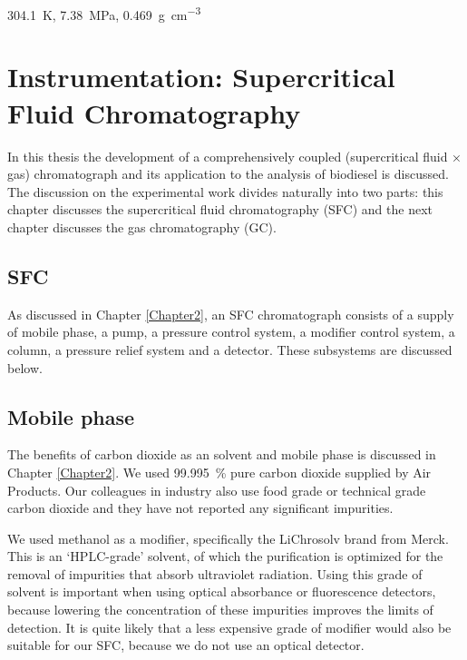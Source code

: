 
\begin{savequote}[\quotewidth]
\SI{304.1}{\kelvin}, \SI{7.38}{\mega\pascal}, \SI{0.469}{\gram\per\cubic\centi\metre}
\end{savequote}

\chapter{Instrumentation: Supercritical Fluid Chromatography} %

\label{Chapter4} %

In this thesis the development of a comprehensively coupled (supercritical fluid
× gas) chromatograph and its application to the analysis of biodiesel is
discussed. The discussion on the experimental work divides naturally into two
parts: this chapter discusses the supercritical fluid chromatography (SFC) and
the next chapter discusses the gas chromatography (GC).

\section{SFC}

As discussed in Chapter \ref{Chapter2}, an SFC chromatograph consists of a
supply of mobile phase, a pump, a pressure control system, a modifier control
system, a column, a pressure relief system and a detector. These subsystems are
discussed below.

\section{Mobile phase}

The benefits of carbon dioxide as an solvent and mobile phase is discussed in
Chapter \ref{Chapter2}. We used \SI{99.995}{\percent} pure carbon dioxide
supplied by Air Products. Our colleagues in industry also use food grade or
technical grade carbon dioxide and they have not reported any significant
impurities.

We used methanol as a modifier, specifically the LiChrosolv\textregistered{}
brand from Merck. This is an `HPLC-grade' solvent, of which the purification is
optimized for the removal of impurities that absorb ultraviolet radiation. Using
this grade of solvent is important when using optical absorbance or fluorescence
detectors, because lowering the concentration of these impurities improves the
limits of detection. It is quite likely that a less expensive grade of modifier
would also be suitable for our SFC, because we do not use an optical detector.

